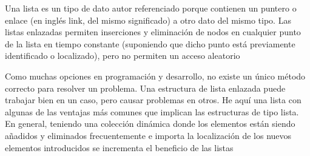 \documentclass[a4paper,12pt]{article}
\begin{document}
\par


\par


\par


\par


\noindent {\fontsize{14pt}{14pt}\selectfont $ \} $}\par

\begin{justify}
{\fontsize{14pt}{14pt}\selectfont Una lista es un tipo de dato autor referenciado porque contienen un puntero o enlace (en inglés link, del mismo significado) a otro dato del mismo tipo. Las listas enlazadas permiten inserciones y eliminación de nodos en cualquier punto de la lista en tiempo constante (suponiendo que dicho punto está previamente identificado o localizado), pero no permiten un acceso aleatorio}
\end{justify}\par


\par

{\fontsize{14pt}{14pt}\selectfont Como muchas opciones en programación y desarrollo, no existe un único método correcto para resolver un problema. Una estructura de lista enlazada puede trabajar bien en un caso, pero causar problemas en otros. He aquí una lista con algunas de las ventajas más comunes que implican las estructuras de tipo lista. En general, teniendo una colección dinámica donde los elementos están siendo añadidos y eliminados frecuentemente e importa la localización de los nuevos elementos introducidos se incrementa el beneficio de las listas}\par
\end{document}
